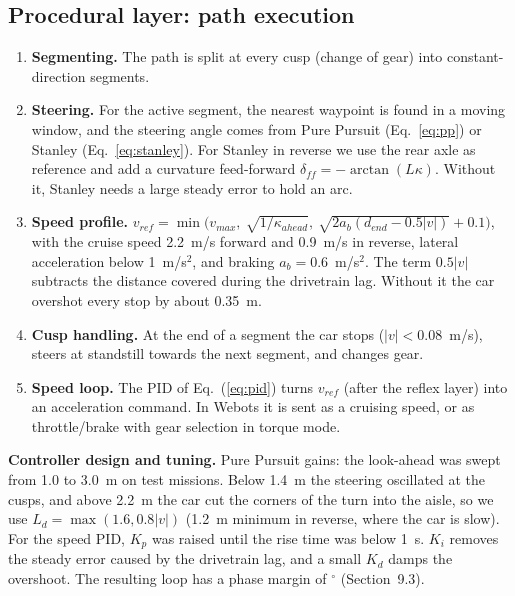 \documentclass[12pt,a4paper]{article}
\begin{document}
\subsection{Procedural layer: path execution}
\begin{enumerate}[itemsep=1pt,topsep=2pt]
\item \textbf{Segmenting.} The path is split at every cusp (change of gear) into constant-direction segments.
\item \textbf{Steering.} For the active segment, the nearest waypoint is found in a moving window, and the steering angle comes from Pure Pursuit (Eq.~\ref{eq:pp}) or Stanley (Eq.~\ref{eq:stanley}). For Stanley in reverse we use the rear axle as reference and add a curvature feed-forward $\delta_{ff} = -\arctan(L\kappa)$. Without it, Stanley needs a large steady error to hold an arc.
\item \textbf{Speed profile.} $v_{ref} = \min\!\big(v_{max},\ \sqrt{1/\kappa_{ahead}},\ \sqrt{2 a_{b} (d_{end} - 0.5|v|)} + 0.1\big)$, with the cruise speed 2.2~m/s forward and 0.9~m/s in reverse, lateral acceleration below 1~m/s$^2$, and braking $a_b = 0.6$~m/s$^2$. The term $0.5|v|$ subtracts the distance covered during the drivetrain lag. Without it the car overshot every stop by about 0.35~m.
\item \textbf{Cusp handling.} At the end of a segment the car stops ($|v| < 0.08$~m/s), steers at standstill towards the next segment, and changes gear.
\item \textbf{Speed loop.} The PID of Eq.~(\ref{eq:pid}) turns $v_{ref}$ (after the reflex layer) into an acceleration command. In Webots it is sent as a cruising speed, or as throttle/brake with gear selection in torque mode.
\end{enumerate}

\textbf{Controller design and tuning.} Pure Pursuit gains: the look-ahead was swept from 1.0 to 3.0~m on test missions. Below 1.4~m the steering oscillated at the cusps, and above 2.2~m the car cut the corners of the turn into the aisle, so we use $L_d = \max(1.6, 0.8|v|)$ (1.2~m minimum in reverse, where the car is slow). For the speed PID, $K_p$ was raised until the rise time was below 1~s. $K_i$ removes the steady error caused by the drivetrain lag, and a small $K_d$ damps the overshoot. The resulting loop has a phase margin of \PhaseMargin$^\circ$ (Section~9.3).
\end{document}
